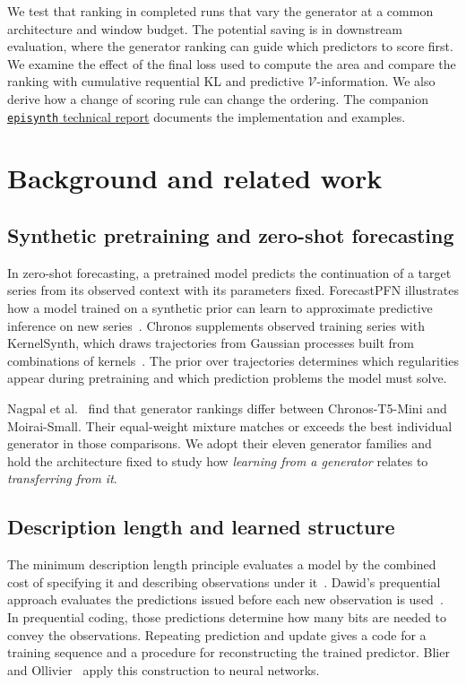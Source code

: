 \documentclass[10pt,a4paper]{article}
\theoremstyle{definition}
\begin{document}
We test that ranking in completed runs that vary the generator at a common
architecture and window budget. The potential saving is in downstream
evaluation, where the generator ranking can guide which predictors to score
first. We examine the effect of the final loss used to compute the area and
compare the ranking with cumulative requential KL and predictive
$\mathcal V$-information. We also derive how a change of scoring rule can
change the ordering. The companion
\href{https://github.com/intsystems/Epiplexity/tree/main/publications/technical_report}
{\texttt{episynth} technical report} documents the implementation and examples.

\section{Background and related work}\label{sec:background}

\subsection{Synthetic pretraining and zero-shot forecasting}
In zero-shot forecasting, a pretrained model predicts the continuation of a
target series from its observed context with its parameters fixed. ForecastPFN
illustrates how a model trained on a synthetic prior can learn to approximate
predictive inference on new series~\cite{dooley2023}. Chronos supplements
observed training series with KernelSynth, which draws trajectories from
Gaussian processes built from combinations of kernels~\cite{ansari2024}.
The prior over trajectories determines which regularities appear during
pretraining and which prediction problems the model must solve.

Nagpal et al.~\cite{nagpal2026} find that generator rankings differ between
Chronos-T5-Mini and Moirai-Small. Their equal-weight mixture matches or
exceeds the best individual generator in those comparisons. We adopt their
eleven generator families and hold the architecture fixed to study how
\emph{learning from a generator} relates to \emph{transferring from it}.

\newpage
\subsection{Description length and learned structure}
The minimum description length principle evaluates a model by the combined
cost of specifying it and describing observations under it~\cite{rissanen1978}.
Dawid's prequential approach evaluates the predictions issued before each new
observation is used~\cite{dawid1984}. In prequential coding, those predictions
determine how many bits are needed to convey the observations. Repeating
prediction and update gives a code for a training sequence and a procedure
for reconstructing the trained predictor. Blier and Ollivier~\cite{blier2018}
apply this construction to neural networks.
\end{document}
